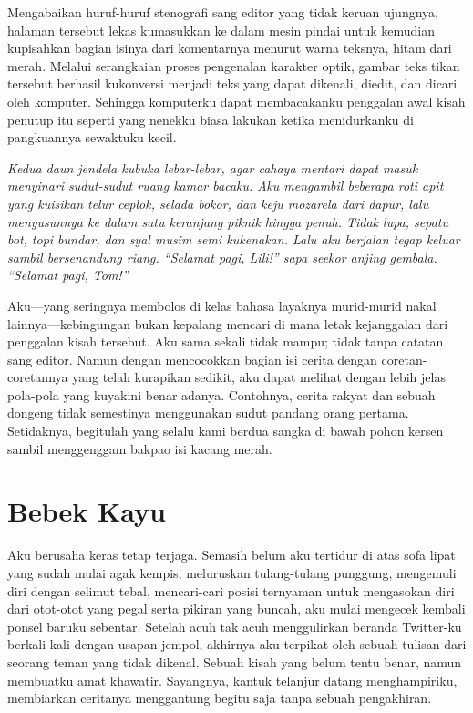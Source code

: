 \documentclass[smalldemyvopaper,11pt,twoside,onecolumn,openright,extrafontsizes]{memoir}
\begin{document}

Mengabaikan huruf-huruf stenografi sang editor yang tidak keruan ujungnya, halaman tersebut lekas kumasukkan ke dalam mesin pindai untuk kemudian kupisahkan bagian isinya dari komentarnya menurut warna teksnya, hitam dari merah. Melalui serangkaian proses pengenalan karakter optik, gambar teks tikan tersebut berhasil kukonversi menjadi teks yang dapat dikenali, diedit, dan dicari oleh komputer. Sehingga komputerku dapat membacakanku penggalan awal kisah penutup itu seperti yang nenekku biasa lakukan ketika menidurkanku di pangkuannya sewaktuku kecil.

\textit{Kedua daun jendela kubuka lebar-lebar, agar cahaya mentari dapat masuk menyinari sudut-sudut ruang kamar bacaku. Aku mengambil beberapa roti apit yang kuisikan telur ceplok, selada bokor, dan keju mozarela dari dapur, lalu menyusunnya ke dalam satu keranjang piknik hingga penuh. Tidak lupa, sepatu bot, topi bundar, dan syal musim semi kukenakan. Lalu aku berjalan tegap keluar sambil bersenandung riang. ``Selamat pagi, Lili!'' sapa seekor anjing gembala. ``Selamat pagi, Tom!''}


Aku---yang seringnya membolos di kelas bahasa layaknya murid-murid nakal lainnya---kebingungan bukan kepalang mencari di mana letak kejanggalan dari penggalan kisah tersebut. Aku sama sekali tidak mampu; tidak tanpa catatan sang editor. Namun dengan mencocokkan bagian isi cerita dengan coretan-coretannya yang telah kurapikan sedikit, aku dapat melihat dengan lebih jelas pola-pola yang kuyakini benar adanya. Contohnya, cerita rakyat dan sebuah dongeng tidak semestinya menggunakan sudut pandang orang pertama. Setidaknya, begitulah yang selalu kami berdua sangka di bawah pohon kersen sambil menggenggam bakpao isi kacang merah.

\chapter{Bebek Kayu}


Aku berusaha keras tetap terjaga. Semasih belum aku tertidur di atas sofa lipat yang sudah mulai agak kempis, meluruskan tulang-tulang punggung, mengemuli diri dengan selimut tebal, mencari-cari posisi ternyaman untuk mengasokan diri dari otot-otot yang pegal serta pikiran yang buncah, aku mulai mengecek kembali ponsel baruku sebentar. Setelah acuh tak acuh menggulirkan beranda Twitter-ku berkali-kali dengan usapan jempol, akhirnya aku terpikat oleh sebuah tulisan dari seorang teman yang tidak dikenal. Sebuah kisah yang belum tentu benar, namun membuatku amat khawatir. Sayangnya, kantuk telanjur datang menghampiriku, membiarkan ceritanya menggantung begitu saja tanpa sebuah pengakhiran.
\end{document}

